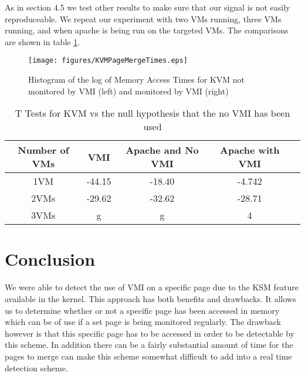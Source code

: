 As in section 4.5 we test other results to make sure that our signal is not easily reproduceable. We repeat our experiment with two VMs running, three VMs running, and when apache is being run on the targeted VMs. The comparisons are shown in table \ref{PageMergeStats}. 


\begin{figure}
	  \centering
	  \texttt{[image: figures/KVMPageMergeTimes.eps]}
	  \caption{Histogram of the log of Memory Access Times for KVM not monitored by VMI (left) and monitored by VMI (right)}
	  \label{PageMergeHists}
\end{figure}


\begin{table}
\centering
  \begin{tabular}{| c | c | c | c | c | }
    \hline
    Number of VMs   & VMI & Apache and No VMI & Apache with VMI \\ \hline
    1VM  & -44.15 & -18.40 & -4.742 \\ \hline 
    2VMs  & -29.62 & -32.62 & -28.71 \\ \hline
    3VMs  & g & g & 4  \\ \hline
  \end{tabular}
  \caption{T Tests for KVM vs the null hypothesis that the no VMI has been used}
  \label{PageMergeStats}
\end{table} 


\section{Conclusion}\label{ConclusionChapter6}

We were able to detect the use of VMI on a specific page due to the KSM feature available in the kernel. This approach has both benefits and drawbacks. It allows us to determine whether or not a specific page has been accessed in memory which can be of use if a set page is being monitored regularly. The drawback however is that this specific page has to be accessed in order to be detectable by this scheme. In addition there can be a fairly substantial amount of time for the pages to merge can make this scheme somewhat difficult to add into a real time detection scheme. 


